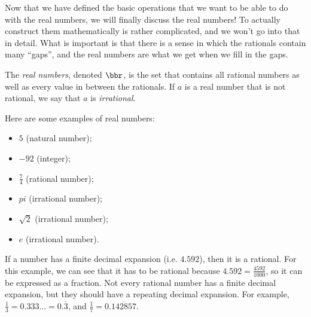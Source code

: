 \documentclass[boxes,serif]{seastaralgebras_expository}
\begin{document}
Now that we have defined the basic operations that we want to be able to do with the real numbers, we will finally discuss the real numbers! To actually construct them mathematically is rather complicated, and we won't go into that in detail. What is important is that there is a sense in which the rationals contain many ``gaps'', and the real numbers are what we get when we fill in the gaps.

\begin{defn} \label{def:reals}
    The \emph{real numbers}, denoted $\bbr$, is the set that contains all rational numbers as well as every value in between the rationals. If $a$ is a real number that is not rational, we say that $a$ is \emph{irrational}.
\end{defn}

\begin{example}
    Here are some examples of real numbers:
    \begin{itemize}
        \item $5$ (natural number);
        \item $-92$ (integer);
        \item $\frac{7}{4}$ (rational number);
        \item $pi$ (irrational number);
        \item $\sqrt{2}$ (irrational number);
        \item $e$ (irrational number).
    \end{itemize}
\end{example}

\begin{note}
    If a number has a finite decimal expansion (i.e. $4.592$), then it is a rational. For this example, we can see that it has to be rational because $4.592 = \frac{4592}{1000}$, so it can be expressed as a fraction. Not every rational number has a finite decimal expansion, but they should have a repeating decimal expansion. For example, $\frac{1}{3} = 0.333\ldots = 0.\overline{3}$, and $\frac{1}{7} = 0.\overline{142857}$.
\end{note}




\end{document}
